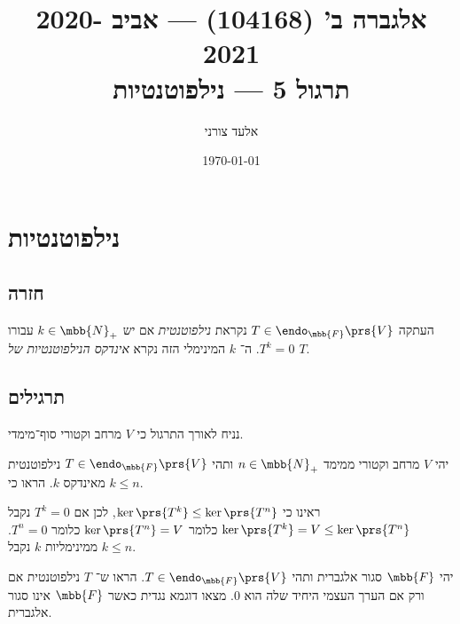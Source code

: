 \documentclass[a4paper,10pt,oneside,openany]{article}
\title{
אלגברה ב' (104168) \textenglish{---} אביב 2020-2021
\\
תרגול 5 \textenglish{---} נילפוטנטיות
}
\author{אלעד צורני}
\date{\today}
\begin{document}
\maketitle

\section{נילפוטנטיות}

\subsection{חזרה}

\begin{definition}
העתקה
$T \in \endo_{\mbb{F}}\prs{V}$
נקראת
\emph{נילפוטנטית}
אם יש
$k \in \mbb{N}_+$
עבורו
$T^k = 0$.
ה־%
$k$
המינימלי הזה נקרא
\emph{אינדקס הנילפוטנטיות של
$T$}.
\end{definition}

\subsection{תרגילים}

\begin{remark}
נניח לאורך התרגול כי
$V$
מרחב וקטורי סוף־מימדי.
\end{remark}

\begin{exercise}
יהי
$V$
מרחב וקטורי ממימד
$n \in \mbb{N}_+$
ותהי
$T \in \endo_{\mbb{F}}\prs{V}$
נילפוטנטית מאינדקס
$k$.
הראו כי
$k \leq n$.
\end{exercise}

\begin{solution}
ראינו כי
$\ker\prs{T^k} \leq \ker\prs{T^n}$,
לכן אם
$T^k = 0$
נקבל
$\ker\prs{T^k} = V \leq \ker\prs{T^n}$
כלומר
$\ker\prs{T^n} = V$
כלומר
$T^n = 0$.
ממינימליות
$k$
נקבל
$k \leq n$.
\end{solution}

\begin{exercise}
יהי
$\mbb{F}$
סגור אלגברית ותהי
$T \in \endo_{\mbb{F}}\prs{V}$.
הראו ש־%
$T$
 נילפוטנטית אם ורק אם הערך העצמי היחיד שלה הוא
$0$.
מצאו דוגמא נגדית כאשר
$\mbb{F}$
אינו סגור אלגברית.
\end{exercise}
\end{document}

